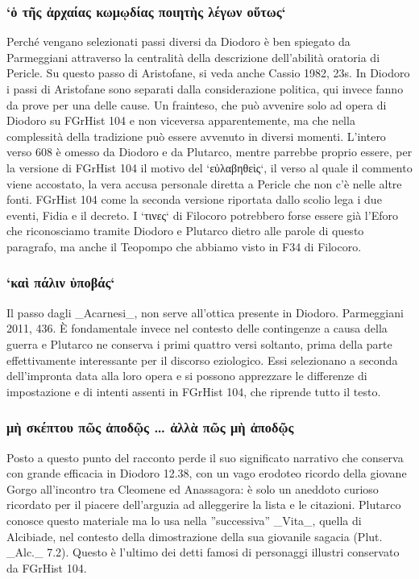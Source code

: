 {            \subsubsection{`ὁ τῆς ἀρχαίας κωμῳδίας ποιητὴς λέγων οὕτως`}
            Perché vengano selezionati passi diversi da  Diodoro  è ben spiegato da Parmeggiani attraverso la centralità della descrizione dell'abilità oratoria di Pericle. Su questo passo di Aristofane, si veda anche Cassio 1982, 23s. In  Diodoro i passi di Aristofane  sono separati dalla considerazione politica, qui invece fanno da prove per una delle cause. Un frainteso, che può avvenire solo ad opera di  Diodoro su FGrHist 104 e non viceversa apparentemente, ma che nella complessità della tradizione può essere avvenuto in diversi momenti.   L'intero verso 608 è omesso da  Diodoro e da Plutarco, mentre parrebbe proprio essere, per la versione di FGrHist 104 il motivo del  `εὐλαβηθεὶς`, il verso al quale il commento viene accostato, la vera accusa personale diretta a Pericle  che non c'è nelle altre fonti. FGrHist 104 come la seconda versione riportata dallo scolio lega i due eventi, Fidia e il decreto. I `τινες` di Filocoro potrebbero forse essere già l'Eforo che riconosciamo tramite  Diodoro e Plutarco dietro alle parole di questo paragrafo, ma anche il Teopompo  che abbiamo visto in F34 di Filocoro. 
                        
            \subsubsection{`καὶ πάλιν ὑποβάς`}
            Il passo dagli _Acarnesi_, non serve all'ottica presente in Diodoro. Parmeggiani 2011, 436. È fondamentale invece nel contesto delle contingenze a causa della guerra e Plutarco ne conserva i primi quattro versi soltanto, prima della parte effettivamente interessante per il discorso eziologico. Essi selezionano a seconda dell'impronta data alla loro opera e si possono apprezzare le differenze di impostazione e di intenti assenti in FGrHist 104, che riprende tutto il testo.
            
            \subsubsection{\textgreek{μὴ σκέπτου πῶς ἀποδῷς … ἀλλὰ πῶς μὴ ἀποδῷς}}
       Posto a questo punto del racconto perde il suo significato narrativo che conserva con grande efficacia in  Diodoro 12.38, con un vago erodoteo ricordo della giovane Gorgo all'incontro tra Cleomene ed Anassagora: è solo un aneddoto curioso ricordato per il piacere dell'arguzia ad alleggerire la lista e le citazioni. Plutarco conosce questo materiale ma lo usa nella ''successiva'' _Vita_, quella di Alcibiade, nel contesto della dimostrazione della sua giovanile sagacia (Plut. _Alc._ 7.2). Questo è l'ultimo dei detti famosi di personaggi illustri conservato da FGrHist 104.
            
}

